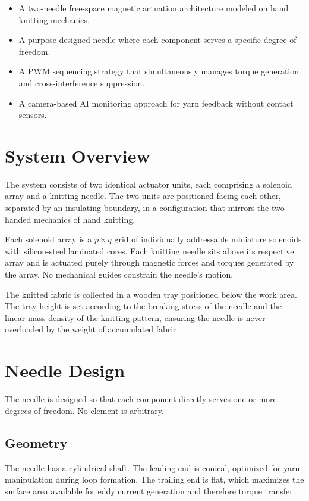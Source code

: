 \documentclass[12pt, a4paper]{article}
\begin{document}
\begin{itemize}
    \item A two-needle free-space magnetic actuation architecture modeled on hand
    knitting mechanics.
    \item A purpose-designed needle where each component serves a specific
    degree of freedom.
    \item A PWM sequencing strategy that simultaneously manages torque generation
    and cross-interference suppression.
    \item A camera-based AI monitoring approach for yarn feedback without
    contact sensors.
\end{itemize}

\section{System Overview}

The system consists of two identical actuator units, each comprising a solenoid
array and a knitting needle. The two units are positioned facing each other,
separated by an insulating boundary, in a configuration that mirrors the
two-handed mechanics of hand knitting.

Each solenoid array is a $p \times q$ grid of individually addressable miniature
solenoids with silicon-steel laminated cores. Each knitting needle sits above its
respective array and is actuated purely through magnetic forces and torques
generated by the array. No mechanical guides constrain the needle's motion.

The knitted fabric is collected in a wooden tray positioned below the work area.
The tray height is set according to the breaking stress of the needle and the
linear mass density of the knitting pattern, ensuring the needle is never
overloaded by the weight of accumulated fabric.

\section{Needle Design}

The needle is designed so that each component directly serves one or more
degrees of freedom. No element is arbitrary.

\subsection{Geometry}
The needle has a cylindrical shaft. The leading end is conical, optimized
for yarn manipulation during loop formation. The trailing end is flat,
which maximizes the surface area available for eddy current generation
and therefore torque transfer.
\end{document}
